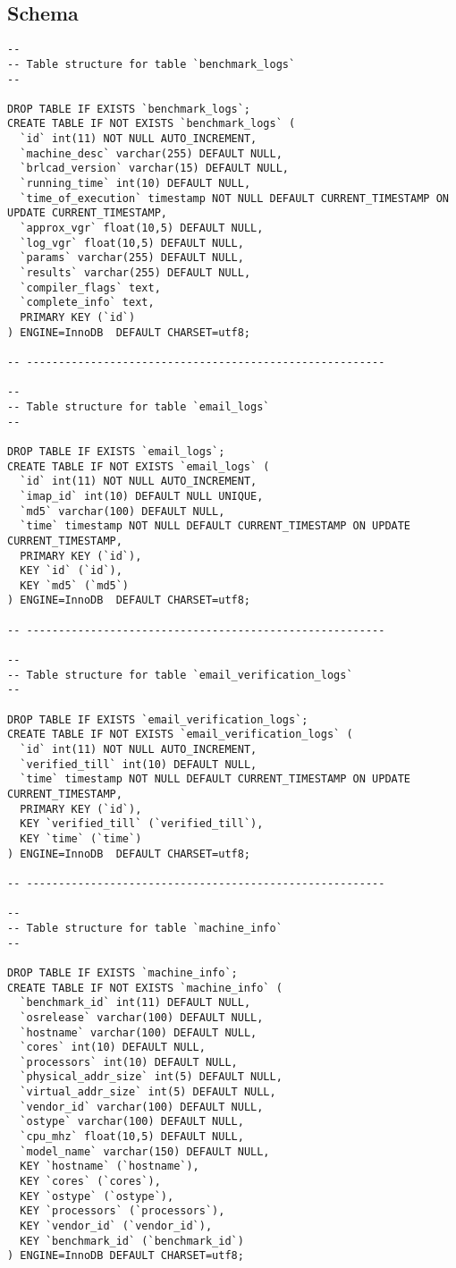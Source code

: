 \documentclass[a4paper,12pt, titlepage]{article}
\begin{document}
\subsection{Schema}
\begin{verbatim}
--
-- Table structure for table `benchmark_logs`
--

DROP TABLE IF EXISTS `benchmark_logs`;
CREATE TABLE IF NOT EXISTS `benchmark_logs` (
  `id` int(11) NOT NULL AUTO_INCREMENT,
  `machine_desc` varchar(255) DEFAULT NULL,
  `brlcad_version` varchar(15) DEFAULT NULL,
  `running_time` int(10) DEFAULT NULL,
  `time_of_execution` timestamp NOT NULL DEFAULT CURRENT_TIMESTAMP ON UPDATE CURRENT_TIMESTAMP,
  `approx_vgr` float(10,5) DEFAULT NULL,
  `log_vgr` float(10,5) DEFAULT NULL,
  `params` varchar(255) DEFAULT NULL,
  `results` varchar(255) DEFAULT NULL,
  `compiler_flags` text,
  `complete_info` text,
  PRIMARY KEY (`id`)
) ENGINE=InnoDB  DEFAULT CHARSET=utf8;

-- --------------------------------------------------------

--
-- Table structure for table `email_logs`
--

DROP TABLE IF EXISTS `email_logs`;
CREATE TABLE IF NOT EXISTS `email_logs` (
  `id` int(11) NOT NULL AUTO_INCREMENT,
  `imap_id` int(10) DEFAULT NULL UNIQUE,
  `md5` varchar(100) DEFAULT NULL,
  `time` timestamp NOT NULL DEFAULT CURRENT_TIMESTAMP ON UPDATE CURRENT_TIMESTAMP,
  PRIMARY KEY (`id`),
  KEY `id` (`id`),
  KEY `md5` (`md5`)
) ENGINE=InnoDB  DEFAULT CHARSET=utf8;

-- --------------------------------------------------------

--
-- Table structure for table `email_verification_logs`
--

DROP TABLE IF EXISTS `email_verification_logs`;
CREATE TABLE IF NOT EXISTS `email_verification_logs` (
  `id` int(11) NOT NULL AUTO_INCREMENT,
  `verified_till` int(10) DEFAULT NULL,
  `time` timestamp NOT NULL DEFAULT CURRENT_TIMESTAMP ON UPDATE CURRENT_TIMESTAMP,
  PRIMARY KEY (`id`),
  KEY `verified_till` (`verified_till`),
  KEY `time` (`time`)
) ENGINE=InnoDB  DEFAULT CHARSET=utf8;

-- --------------------------------------------------------

--
-- Table structure for table `machine_info`
--

DROP TABLE IF EXISTS `machine_info`;
CREATE TABLE IF NOT EXISTS `machine_info` (
  `benchmark_id` int(11) DEFAULT NULL,
  `osrelease` varchar(100) DEFAULT NULL,
  `hostname` varchar(100) DEFAULT NULL,
  `cores` int(10) DEFAULT NULL,
  `processors` int(10) DEFAULT NULL,
  `physical_addr_size` int(5) DEFAULT NULL,
  `virtual_addr_size` int(5) DEFAULT NULL,
  `vendor_id` varchar(100) DEFAULT NULL,
  `ostype` varchar(100) DEFAULT NULL,
  `cpu_mhz` float(10,5) DEFAULT NULL,
  `model_name` varchar(150) DEFAULT NULL,
  KEY `hostname` (`hostname`),
  KEY `cores` (`cores`),
  KEY `ostype` (`ostype`),
  KEY `processors` (`processors`),
  KEY `vendor_id` (`vendor_id`),
  KEY `benchmark_id` (`benchmark_id`)
) ENGINE=InnoDB DEFAULT CHARSET=utf8;


\end{verbatim}
\end{document}
